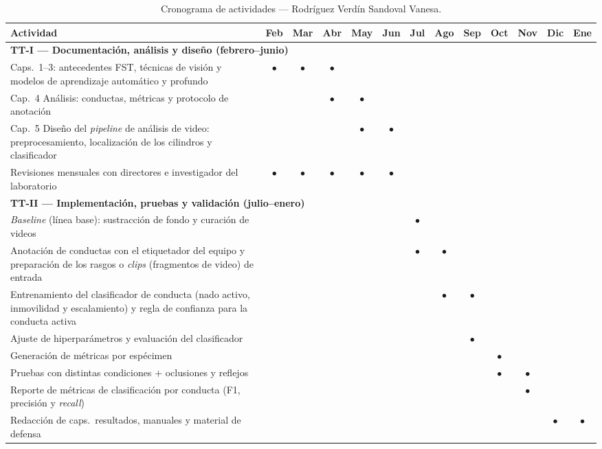 \begin{table}
\centering
\caption{Cronograma de actividades --- Rodríguez Verdín Sandoval Vanesa.}
\label{tab:cronograma_vanesa}
\small
\setlength{\tabcolsep}{4pt}
\renewcommand{\arraystretch}{1.4}
\begin{tabular}{|p{8.5cm}|c|c|c|c|c||c|c|c|c|c|c|c|}
\hline
\textbf{Actividad}
  & \textbf{Feb} & \textbf{Mar} & \textbf{Abr} & \textbf{May} & \textbf{Jun}
  & \textbf{Jul} & \textbf{Ago} & \textbf{Sep} & \textbf{Oct} & \textbf{Nov} & \textbf{Dic} & \textbf{Ene} \\
\hline
\multicolumn{13}{|l|}{\textbf{TT-I --- Documentación, análisis y diseño (febrero--junio)}} \\
\hline
Caps.~1--3: antecedentes FST, técnicas de visión y modelos de aprendizaje automático y profundo
  & $\bullet$ & $\bullet$ & $\bullet$ & & & & & & & & & \\
\hline
Cap.~4 Análisis: conductas, métricas y protocolo de anotación
  & & & $\bullet$ & $\bullet$ & & & & & & & & \\
\hline
Cap.~5 Diseño del \textit{pipeline} de análisis de video: preprocesamiento, localización de los cilindros y clasificador
  & & & & $\bullet$ & $\bullet$ & & & & & & & \\
\hline
Revisiones mensuales con directores e investigador del laboratorio
  & $\bullet$ & $\bullet$ & $\bullet$ & $\bullet$ & $\bullet$ & & & & & & & \\
\hline
\multicolumn{13}{|l|}{\textbf{TT-II --- Implementación, pruebas y validación (julio--enero)}} \\
\hline
\textit{Baseline} (línea base): sustracción de fondo y curación de videos
  & & & & & & $\bullet$ & & & & & & \\
\hline
Anotación de conductas con el etiquetador del equipo y preparación de los rasgos o \textit{clips} (fragmentos de video) de entrada
  & & & & & & $\bullet$ & $\bullet$ & & & & & \\
\hline
Entrenamiento del clasificador de conducta (nado activo, inmovilidad y escalamiento) y regla de confianza para la conducta activa
  & & & & & & & $\bullet$ & $\bullet$ & & & & \\
\hline
Ajuste de hiperparámetros y evaluación del clasificador
  & & & & & & & & $\bullet$ & & & & \\
\hline
Generación de métricas por espécimen
  & & & & & & & & & $\bullet$ & & & \\
\hline
Pruebas con distintas condiciones $+$ oclusiones y reflejos
  & & & & & & & & & $\bullet$ & $\bullet$ & & \\
\hline
Reporte de métricas de clasificación por conducta (F1, precisión y \textit{recall})
  & & & & & & & & & & $\bullet$ & & \\
\hline
Redacción de caps.\ resultados, manuales y material de defensa
  & & & & & & & & & & & $\bullet$ & $\bullet$ \\
\hline
\end{tabular}
\end{table}

